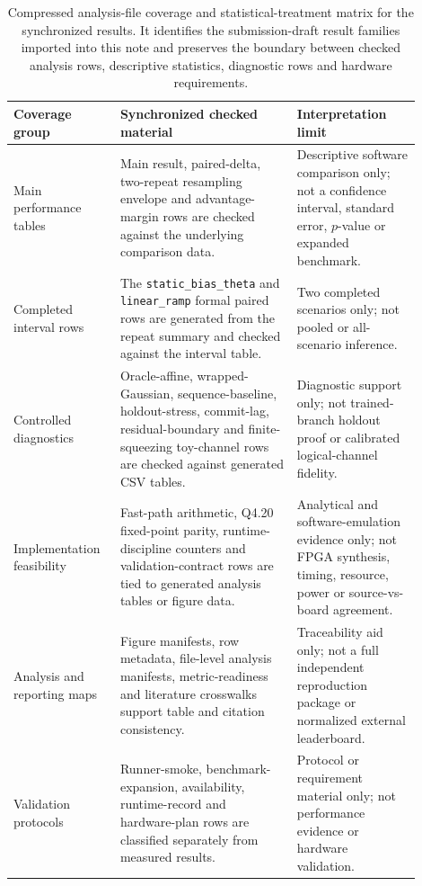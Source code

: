 \documentclass[11pt]{article}
\begin{document}
\begin{table}[ht]
\centering
\scriptsize
\setlength{\tabcolsep}{2.5pt}
\begin{tabular}{>{\raggedright\arraybackslash}p{0.22\linewidth}
                >{\raggedright\arraybackslash}p{0.40\linewidth}
                >{\raggedright\arraybackslash}p{0.28\linewidth}}
\toprule
Coverage group & Synchronized checked material & Interpretation limit \\
\midrule
Main performance tables & Main result, paired-delta, two-repeat resampling
envelope and advantage-margin rows are checked against the underlying
comparison data. & Descriptive software comparison only; not a confidence
interval, standard error, \(p\)-value or expanded benchmark. \\
\addlinespace
Completed interval rows & The \texttt{static\_bias\_theta} and
\texttt{linear\_ramp} formal paired rows are generated from the repeat summary
and checked against the interval table. & Two completed scenarios only; not
pooled or all-scenario inference. \\
\addlinespace
Controlled diagnostics & Oracle-affine, wrapped-Gaussian, sequence-baseline,
holdout-stress, commit-lag, residual-boundary and finite-squeezing toy-channel
rows are checked against generated CSV tables. & Diagnostic support only; not
trained-branch holdout proof or calibrated logical-channel fidelity. \\
\addlinespace
Implementation feasibility & Fast-path arithmetic, Q4.20 fixed-point parity,
runtime-discipline counters and validation-contract rows are tied to generated
analysis tables or figure data. & Analytical and software-emulation evidence
only; not FPGA synthesis, timing, resource, power or source-vs-board agreement. \\
\addlinespace
Analysis and reporting maps & Figure manifests, row metadata, file-level
analysis manifests, metric-readiness and literature crosswalks support table
and citation consistency. & Traceability aid only; not a full independent
reproduction package or normalized external leaderboard. \\
\addlinespace
Validation protocols & Runner-smoke, benchmark-expansion, availability,
runtime-record and hardware-plan rows are classified separately from measured
results. & Protocol or requirement material only; not performance evidence or
hardware validation. \\
\bottomrule
\end{tabular}
\caption{Compressed analysis-file coverage and statistical-treatment matrix
for the synchronized results.  It identifies the submission-draft result
families imported into this note and preserves the boundary between checked
analysis rows, descriptive statistics, diagnostic rows and hardware
requirements.}
\label{tab:coverage-treatment-note}
\end{table}
\end{document}
